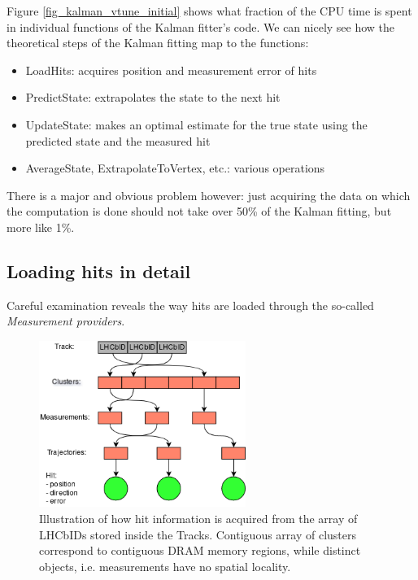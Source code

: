 \documentclass[12pt]{article}
\begin{document}
Figure \ref{fig_kalman_vtune_initial} shows what fraction of the CPU time is spent in individual functions of the Kalman fitter's code. We can nicely see how the theoretical steps of the Kalman fitting map to the functions:
\begin{itemize}
	\item LoadHits: acquires position and measurement error of hits
	\item PredictState: extrapolates the state to the next hit
	\item UpdateState: makes an optimal estimate for the true state using the predicted state and the measured hit
	\item AverageState, ExtrapolateToVertex, etc.: various operations
\end{itemize}
There is a major and obvious problem however: just acquiring the data on which the computation is done should not take over 50\% of the Kalman fitting, but more like 1\%.	


\subsection{Loading hits in detail}

Careful examination reveals the way hits are loaded through the so-called \textit{Measurement providers}.
	
\begin{figure}[H]
	\begin{center}
		\includegraphics[width=0.6\textwidth]{kalmanfit_loadhits_schematic}
	\end{center}
	\caption{Illustration of how hit information is acquired from the array of LHCbIDs stored inside the Tracks. Contiguous array of clusters correspond to contiguous DRAM memory regions, while distinct objects, i.e. measurements have no spatial locality.}
	\label{fig_kalmanfit_loadhits_schematic}
\end{figure}
\end{document}
